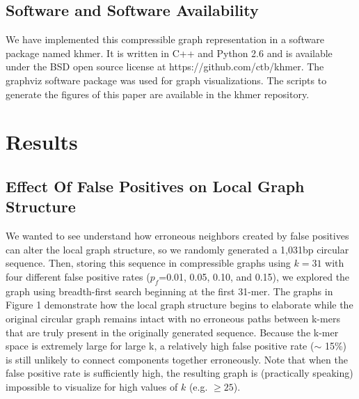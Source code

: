 \documentclass[12pt]{article} \usepackage{simplemargins}
\begin{document}
\subsection{Software and Software Availability}
We have implemented this compressible graph representation in a software package
named khmer.
It is written in C++
and Python 2.6 and is available under the BSD open source license at
https://github.com/ctb/khmer.
The graphviz software 
package was used for graph visualizations. The scripts to 
generate the figures of this paper are available in the khmer repository.

\section{Results}

\subsection{Effect Of False Positives on Local Graph Structure}
We wanted to see understand how erroneous neighbors created 
by false positives can alter 
the local graph structure, so we randomly generated a 1,031bp circular sequence.
Then, storing this sequence in compressible graphs using $k=31$ with
four different false positive rates ($p_f$=0.01, 0.05, 0.10, and
0.15), we explored the graph using breadth-first search beginning at
the first 31-mer. 
The graphs in Figure 
1 demonstrate how
the local graph structure begins to elaborate while the original circular
graph remains intact with no erroneous paths between k-mers that are
truly present in the originally generated sequence. Because the k-mer
space is extremely large for large k, a relatively high false positive 
rate ($\sim$ 15\%) is still 
unlikely to connect components
together erroneously. Note that when the false positive
rate is sufficiently high, the resulting graph is 
(practically speaking) impossible to visualize for high values of $k$ (e.g. $\ge 25$). 
\end{document}
